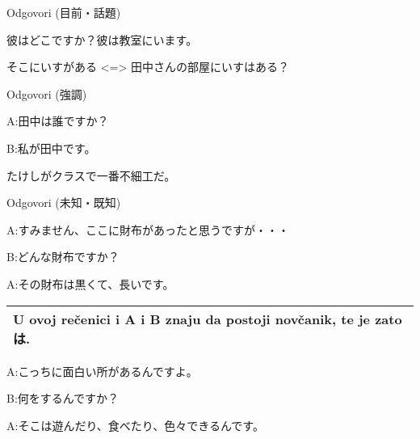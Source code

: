 	\begin{mondai}{Odgovori (目前・話題)}
		\item 彼はどこですか？彼は教室にいます。
		\item そこにいすがある <=> 田中さんの部屋にいすはある？
	\end{mondai}
	
	\newpage
	
	\begin{mondai}{Odgovori (強調)}
		\item 
		A:田中は誰ですか？
		
		B:私が田中です。
		\item たけしがクラスで一番不細工だ。
	\end{mondai}
	
	\begin{mondai}{Odgovori (未知・既知)}
		\item 
		A:すみません、ここに財布があったと思うですが・・・
		
		B:どんな財布ですか？
		
		A:その財布は黒くて、長いです。
		
		
		\vspace{10pt}
		\begin{tabular}{|l|}
		\hline
		U ovoj rečenici i A i B znaju da postoji novčanik, te je zato は.\\\hline
		\end{tabular}
		\vspace{10pt}		
		
		
		\item 	
		A:こっちに面白い所があるんですよ。
		
		B:何をするんですか？
		
		A:そこは遊んだり、食べたり、色々できるんです。
	\end{mondai}

